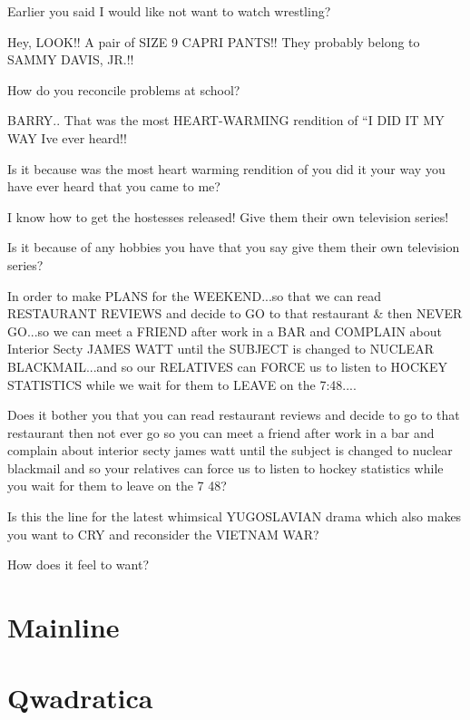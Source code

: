 \documentclass[cropmarks, frame, english]{idamasterthesis}
\begin{document}
Earlier you said I would like not want to watch wrestling?

Hey, LOOK!!  A pair of SIZE 9 CAPRI PANTS!!  They probably belong to
 SAMMY DAVIS, JR.!!

How do you reconcile problems at school?

BARRY..  That was the most HEART-WARMING rendition of
 ``I DID IT MY WAY Ive ever heard!!

Is it because was the most heart warming rendition of you did it your
way you have ever heard that you came to me?

I know how to get the hostesses released!  Give them their own
 television series!

Is it because of any hobbies you have that you say give them their own
television series?

In order to make PLANS for the WEEKEND...so that we can read RESTAURANT
 REVIEWS and decide to GO to that restaurant \& then NEVER GO...so we can
 meet a FRIEND after work in a BAR and COMPLAIN about Interior Secty
 JAMES WATT until the SUBJECT is changed to NUCLEAR BLACKMAIL...and so
 our RELATIVES can FORCE us to listen to HOCKEY STATISTICS while we
 wait for them to LEAVE on the 7:48....

Does it bother you that you can read restaurant reviews and decide to
go to that restaurant then not ever go so you can meet a friend after
work in a bar and complain about interior secty james watt until the
subject is changed to nuclear blackmail and so your relatives can
force us to listen to hockey statistics while you wait for them to
leave on the 7 48?

Is this the line for the latest whimsical YUGOSLAVIAN drama which also
 makes you want to CRY and reconsider the VIETNAM WAR?

How does it feel to want?

\section{Mainline}

\section{Qwadratica}
\end{document}
